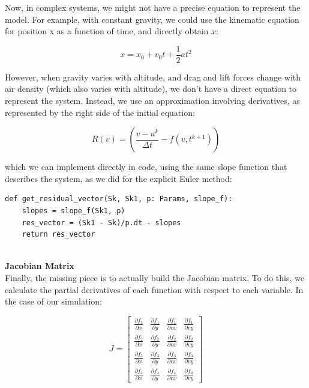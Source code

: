 \documentclass[runningheads]{llncs}
\begin{document}
Now, in complex systems, we might not have a precise equation to represent the model. For example, with constant gravity, we could use the kinematic equation for position x as a function of time, and directly obtain \( x \):

\begin{equation}
x = x_0 + v_0 t + \frac{1}{2} a t^2
\end{equation}

However, when gravity varies with altitude, and drag and lift forces change with air density (which also varies with altitude), we don't have a direct equation to represent the system. Instead, we use an approximation involving derivatives, as represented by the right side of the initial equation:

\begin{equation}
R(v) = \left( \frac{v - u^k}{\Delta t} - f(v, t^{k+1}) \right)
\end{equation}

\noindent which we can implement directly in code, using the same slope function that describes the system, as we did for the explicit Euler method:

\begin{verbatim}
def get_residual_vector(Sk, Sk1, p: Params, slope_f):
    slopes = slope_f(Sk1, p) 
    res_vector = (Sk1 - Sk)/p.dt - slopes
    return res_vector
\end{verbatim}


\textbf{\\Jacobian Matrix\\}
Finally, the missing piece is to actually build the Jacobian matrix. To do this, we calculate the partial derivatives of each function with respect to each variable. In the case of our simulation: 

\[
J = \begin{bmatrix}
        \frac{\partial f_1}{\partial x} & \frac{\partial f_1}{\partial y} & \frac{\partial f_1}{\partial vx} & \frac{\partial f_1}{\partial vy} \\
        \frac{\partial f_2}{\partial x} & \frac{\partial f_2}{\partial y} & \frac{\partial f_2}{\partial vx} & \frac{\partial f_2}{\partial vy} \\
        \frac{\partial f_3}{\partial x} & \frac{\partial f_3}{\partial y} & \frac{\partial f_3}{\partial vx} & \frac{\partial f_3}{\partial vy} \\
        \frac{\partial f_4}{\partial x} & \frac{\partial f_4}{\partial y} & \frac{\partial f_4}{\partial vx} & \frac{\partial f_4}{\partial vy}
    \end{bmatrix}
\]
\end{document}
